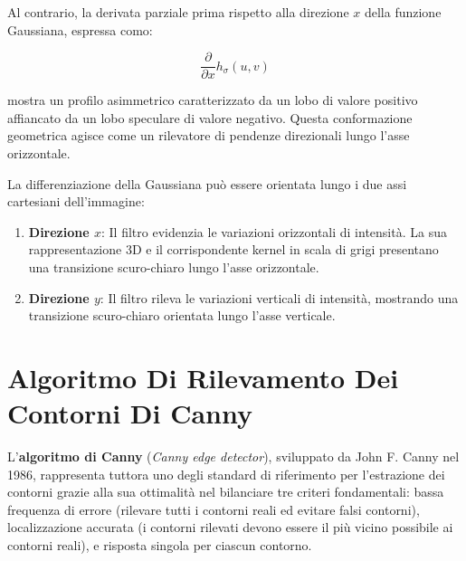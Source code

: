 ﻿\documentclass[11pt, a4paper]{article}
\begin{document}

Al contrario, la derivata parziale prima rispetto alla direzione $x$ della funzione Gaussiana, espressa como:

\[ \frac{\partial}{\partial x} h_\sigma(u, v) \]

mostra un profilo asimmetrico caratterizzato da un lobo di valore positivo affiancato da un lobo speculare di valore negativo. Questa conformazione geometrica agisce come un rilevatore di pendenze direzionali lungo l'asse orizzontale.


La differenziazione della Gaussiana può essere orientata lungo i due assi cartesiani dell'immagine:
\begin{enumerate}
    \item \textbf{Direzione $x$}: Il filtro evidenzia le variazioni orizzontali di intensità. La sua rappresentazione 3D e il corrispondente kernel in scala di grigi presentano una transizione scuro-chiaro lungo l'asse orizzontale.
    \item \textbf{Direzione $y$}: Il filtro rileva le variazioni verticali di intensità, mostrando una transizione scuro-chiaro orientata lungo l'asse verticale.
\end{enumerate}


\newpage

\section{Algoritmo Di Rilevamento Dei Contorni Di Canny}

L'\textbf{algoritmo di Canny} (\emph{Canny edge detector}), sviluppato da John F. Canny nel 1986, rappresenta tuttora uno degli standard di riferimento per l'estrazione dei contorni grazie alla sua ottimalità nel bilanciare tre criteri fondamentali: bassa frequenza di errore (rilevare tutti i contorni reali ed evitare falsi contorni), localizzazione accurata (i contorni rilevati devono essere il più vicino possibile ai contorni reali), e risposta singola per ciascun contorno.
\end{document}
